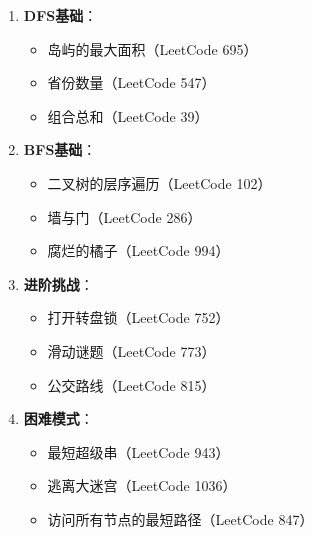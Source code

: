 \documentclass[12pt,a4paper]{article}
\begin{document}
	\begin{enumerate}[leftmargin=*]
		\item \textbf{DFS基础}：
		\begin{itemize}
			\item 岛屿的最大面积（LeetCode 695）
			\item 省份数量（LeetCode 547）
			\item 组合总和（LeetCode 39）
		\end{itemize}
		\item \textbf{BFS基础}：
		\begin{itemize}
			\item 二叉树的层序遍历（LeetCode 102）
			\item 墙与门（LeetCode 286）
			\item 腐烂的橘子（LeetCode 994）
		\end{itemize}
		\item \textbf{进阶挑战}：
		\begin{itemize}
			\item 打开转盘锁（LeetCode 752）
			\item 滑动谜题（LeetCode 773）
			\item 公交路线（LeetCode 815）
		\end{itemize}
		\item \textbf{困难模式}：
		\begin{itemize}
			\item 最短超级串（LeetCode 943）
			\item 逃离大迷宫（LeetCode 1036）
			\item 访问所有节点的最短路径（LeetCode 847）
		\end{itemize}
	\end{enumerate}
	
\end{document}
